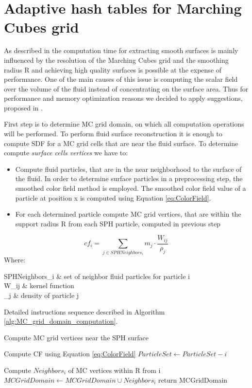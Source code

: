 \section{Adaptive hash tables for Marching Cubes grid}
As described in \cite{Akinchi} the computation time for extracting smooth surfaces is mainly influenced by
the resolution of the Marching Cubes grid and the smoothing radius R and achieving high quality surfaces is possible at the expense of performance. One of the main causes of this issue is computing the scalar field over the volume of the fluid instead of concentrating on the surface area. Thus for performance and memory optimization reasons we decided to apply suggestions, proposed in \cite{Akinchi}.

First step is to determine MC grid domain, on which all computation operations will be performed. To perform fluid surface reconstruction it is enough to compute SDF for a MC grid cells that are near the fluid surface. To determine compute \emph{surface cells vertices} we have to:
\begin{itemize}
		\item Compute fluid particles, that are in the near neighborhood to the surface of the fluid. In order to determine surface particles in a preprocessing step, the smoothed color field method \cite{ColorField} is employed.  The smoothed color field value of a particle at position x is computed using Equation \ref{eq:ColorField}.
		\item For each determined particle compute MC grid vertices, that are within the support radius R from each SPH particle, computed in previous step 
\end{itemize}
\begin{equation} \label{eq:ColorField}
	cf_i = \sum_{j\in SPHNeighbors_i}{m_j \cdot \dfrac{W_{ij}}{\rho_j}}
\end{equation}
Where:
\begin{conditions}
	SPHNeighbors_i & set of neighbor fluid particles for particle i\\
	W_{ij} & kernel function\\
	\rho_j & density of particle j\\
\end{conditions}
Detailed instructions sequence described in Algorithm \ref{alg:MC_grid_domain_computation}.
\begin{algorithm}
	\caption{Compute MC grid vertices near the SPH surface}
	\label{alg:MC_grid_domain_computation}
	\begin{algorithmic}
			\State Compute CF using Equation \ref{eq:ColorField}
				\State $ParticleSet \gets ParticleSet - i$
			\EndIf

		\EndFor
			\State Compute $Neighbors_i$ of MC vertices within R from  i
			\State $MCGridDomain \gets MCGridDomain \cup Neighbors_i$
		\EndFor
		\State return MCGridDomain
	\end{algorithmic}
\end{algorithm} 


